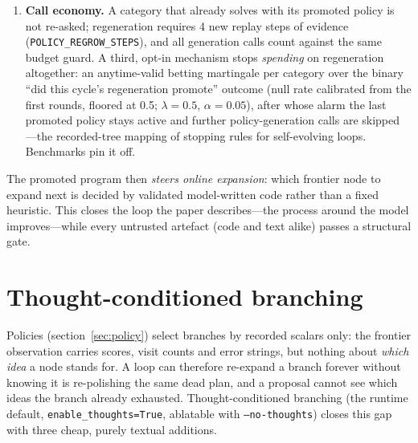 \documentclass[11pt,a4paper]{article}
\newcommand{\hdr}[1]{\textbf{#1}}
\begin{document}
\begin{enumerate}
  over a horizon of $\geq$8 recorded steps (\texttt{MIN\_HORIZON}), and a
  rollout score strictly beating the greedy baseline under the shared
  objective (a tie is not evidence --- the same strictness the promotion gate
  applies).
  When an incumbent exists it is \emph{re-scored on the current tree} rather
  than trusted at its stored score: the replay world grows between cycles,
  and an old threshold would admit candidates that are genuinely worse than
  the incumbent on today's evidence.
  \item \hdr{Call economy.} A category that already solves with its promoted
  policy is not re-asked; regeneration requires 4 new replay steps of
  evidence (\texttt{POLICY\_REGROW\_STEPS}), and all generation calls count
  against the same budget guard. A third, opt-in mechanism stops
  \emph{spending} on regeneration altogether: an anytime-valid betting
  martingale per category over the binary ``did this cycle's regeneration
  promote'' outcome (null rate calibrated from the first rounds, floored at
  0.5; $\lambda{=}0.5$, $\alpha{=}0.05$), after whose alarm the last
  promoted policy stays active and further policy-generation calls are
  skipped \cite{evostop}---the recorded-tree mapping of stopping rules for
  self-evolving loops. Benchmarks pin it off.
\end{enumerate}

The promoted program then \emph{steers online expansion}: which frontier node
to expand next is decided by validated model-written code rather than a fixed
heuristic. This closes the loop the paper describes---the process around the
model improves---while every untrusted artefact (code and text alike) passes a
structural gate.

\section{Thought-conditioned branching}
\label{sec:thoughts}

Policies (section~\ref{sec:policy}) select branches by recorded scalars only:
the frontier observation carries scores, visit counts and error strings, but
nothing about \emph{which idea} a node stands for. A loop can therefore
re-expand a branch forever without knowing it is re-polishing the same dead
plan, and a proposal cannot see which ideas the branch already exhausted.
Thought-conditioned branching (the runtime default,
\texttt{enable\_thoughts=True}, ablatable with \texttt{--no-thoughts}) closes
this gap with three cheap, purely textual additions.
\end{document}
